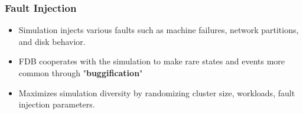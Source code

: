 
\begin{frame}
    \frametitle{Fault Injection}
    \begin{itemize}
        \item Simulation injects various faults such as machine failures, network partitions, and disk behavior.
        \item FDB cooperates with the simulation to make rare states and events more common through "\textbf{buggification}"
        \item Maximizes simulation diversity by randomizing cluster size, workloads, fault injection parameters.
    \end{itemize}
\end{frame} 